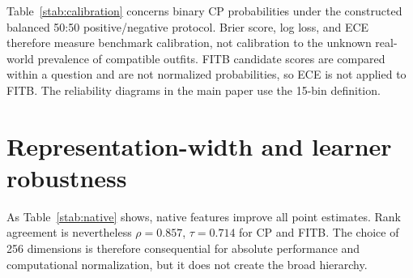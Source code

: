 \documentclass[preprint,12pt]{elsarticle}
\begin{document}
Table~\ref{stab:calibration} concerns binary CP probabilities under the constructed balanced 50:50 positive/negative protocol. Brier score, log loss, and ECE therefore measure benchmark calibration, not calibration to the unknown real-world prevalence of compatible outfits. FITB candidate scores are compared within a question and are not normalized probabilities, so ECE is not applied to FITB. The reliability diagrams in the main paper use the 15-bin definition.

\section{Representation-width and learner robustness}

\begin{table}[htbp]
\caption{IQON PCA-256 versus native-dimensional features. Every native-width setting repeats train-only scaling and validation selection.}
\label{stab:native}
\centering\small
{}
\end{table}

As Table~\ref{stab:native} shows, native features improve all point estimates. Rank agreement is nevertheless $\rho=0.857$, $\tau=0.714$ for CP and FITB. The choice of 256 dimensions is therefore consequential for absolute performance and computational normalization, but it does not create the broad hierarchy.
\end{document}
